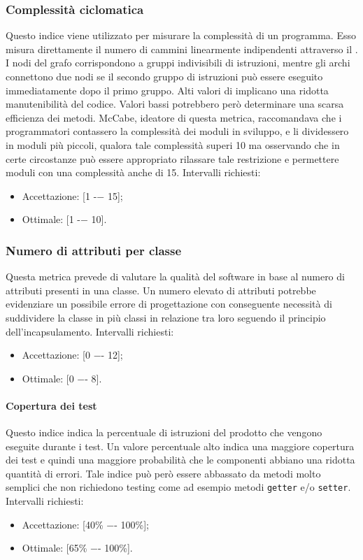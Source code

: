 \subsubsection{Complessità ciclomatica}
Questo indice viene utilizzato per misurare la complessità di un programma. Esso misura direttamente il numero di cammini linearmente indipendenti attraverso il . I nodi del grafo corrispondono a gruppi indivisibili di istruzioni, mentre gli archi connettono due nodi se il secondo gruppo di istruzioni può essere eseguito immediatamente dopo il primo gruppo.
Alti valori di  implicano una ridotta manutenibilità del codice. Valori bassi potrebbero però determinare  una scarsa efficienza dei metodi. McCabe, ideatore di questa metrica, raccomandava che i programmatori contassero la complessità dei moduli in sviluppo, e li dividessero in moduli più piccoli, qualora tale complessità superi 10 ma osservando che in certe circostanze può essere appropriato rilassare tale restrizione e permettere moduli con una complessità anche di 15.
Intervalli richiesti:
\begin{itemize}
\item
Accettazione: [1 -− 15];
\item
Ottimale: [1 -− 10].
\end{itemize}

\subsubsection{Numero di attributi per classe}
Questa metrica prevede di valutare la qualità del software in base al numero di attributi presenti in una classe.
Un numero elevato di attributi potrebbe evidenziare un possibile errore di progettazione con conseguente necessità di suddividere la classe in più classi in relazione tra loro seguendo il principio dell'incapsulamento.
Intervalli richiesti:
\begin{itemize}
\item
Accettazione: [0 −- 12];
\item
Ottimale: [0 −- 8].
\end{itemize}

\paragraph{Copertura dei test}
Questo indice indica la percentuale di istruzioni del prodotto che vengono eseguite durante i test.
Un valore percentuale alto indica una maggiore copertura dei test e quindi una maggiore probabilità che le componenti abbiano una ridotta quantità di errori.
Tale indice può però essere abbassato da metodi molto semplici che non richiedono testing come ad esempio metodi \texttt{getter} e/o \texttt{setter}.
Intervalli richiesti:
\begin{itemize}
\item
Accettazione: [40\% −- 100\%];
\item
Ottimale: [65\% −- 100\%].
\end{itemize}

